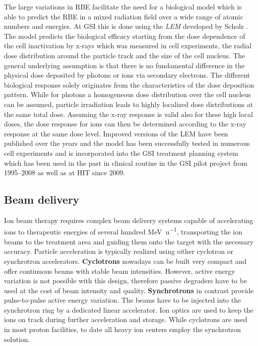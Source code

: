 The large variations in \ac{RBE} facilitate the need for a biological
model which is able to predict the \ac{RBE} in a mixed radiation field
over a wide range of atomic numbers and energies. At \ac{GSI} this is
done using the \emph{\ac{LEM}} developed by Scholz \etal
\citep{Scholz1994,Scholz1996}.  The model predicts the biological
efficacy starting from the dose dependence of the cell inactivation by
x-rays which was measured in cell experiments, the radial dose
distribution around the particle track and the size of the cell
nucleus. The general underlying assumption is that there is no
fundamental difference in the physical dose deposited by photons or
ions via secondary electrons. The different biological response
solely originates from the characteristics of the dose deposition
pattern. While for photons a homogeneous dose distribution over the
cell nucleus can be assumed, particle irradiation leads to highly
localized dose distributions at the same total dose. Assuming the
x-ray response is valid also for these high local doses, the dose
response for ions can then be determined according to the x-ray
response at the same dose level. Improved versions of the \ac{LEM}
have been published over the years
\citep{Elsaesser2006,Elsaesser2007,Elsaesser2009} and the model has
been successfully tested in numerous cell experiments
\citep{Mitaroff1998,Kraemer2000a,Kraemer2003} and is incorporated into
the \ac{GSI} treatment planning system which has been used in the past
in clinical routine in the \ac{GSI} pilot project from 1995--2008
\citep{Kraemer2000,Kraemer2000a} as well as at \ac{HIT} since 2009.


\subsection{Beam delivery}
\label{sec:background:beamdelivery}
Ion beam therapy requires complex beam delivery systems capable of
accelerating ions to therapeutic energies of several hundred
\si{\mega\electronvolt\per\atomicmassunit}, transporting the ion beams
to the treatment area and guiding them onto the target with the
necessary accuracy.  Particle acceleration is typically realized using
either cyclotron or synchrotron accelerators. \textbf{Cyclotrons}
nowadays can be built very compact and offer continuous beams with
stable beam intensities.  However, active energy variation is not
possible with this design, therefore passive degraders have to be used
at the cost of beam intensity and quality. \textbf{Synchrotrons} in
contrast provide pulse-to-pulse active energy variation. The beams
have to be injected into the synchrotron ring by a dedicated linear
accelerator. Ion optics are used to keep the ions on track during
further acceleration and storage. %
While cyclotrons are used in most proton facilities, to date all heavy
ion centers employ the synchrotron solution.

